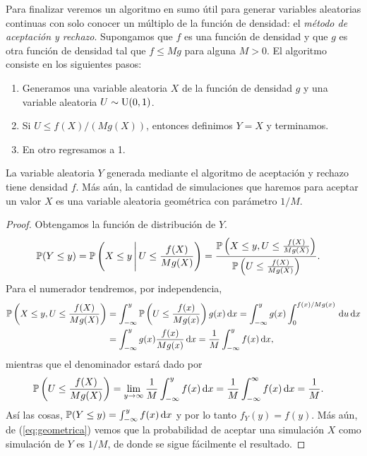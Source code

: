 Para finalizar veremos un algoritmo en sumo útil para generar variables aleatorias continuas con solo conocer un múltiplo de la función de densidad: el \emph{método de aceptación y rechazo}. Supongamos que $f$ es una función de densidad y que $g$ es otra función de densidad tal que $f \leq M g$ para alguna $M > 0$. El algoritmo consiste en los siguientes pasos:
\begin{enumerate}
    \item Generamos una variable aleatoria $X$ de la función de densidad $g$ y una variable aleatoria $U \sim \operatorname{U}(0,1)$.
    \item Si $U \leq f(X) / (M g(X))$, entonces definimos $Y = X$ y terminamos.
    \item En otro regresamos a 1.
\end{enumerate}

\begin{proposition} \label{prop:aceptacion y rechazo}
    La variable aleatoria $Y$ generada mediante el algoritmo de aceptación y rechazo tiene densidad $f$. Más aún, la cantidad de simulaciones que haremos para aceptar un valor $X$ es una variable aleatoria geométrica con parámetro $1/M$.
\end{proposition}

\begin{proof}
    Obtengamos la función de distribución de $Y$. 
    \begin{align*}
        \mathbb P(Y \leq y) & = \mathbb P \left( X \leq y \,\Bigg\vert\, U \leq \frac{f(X)}{M g(X)} \right) 
        = \frac{\mathbb P \left( X \leq y, U \leq \frac{f(X)}{Mg(X)} \right)}{\mathbb P \left(U \leq \frac{f(X)}{Mg(X)} \right)}.
    \end{align*}
    Para el numerador tendremos, por independencia,
    \begin{align*}
        \mathbb P \left( X \leq y, U \leq \frac{f(X)}{Mg(X)} \right) & = \int_{-\infty}^y \mathbb P\left(U \leq \frac{f(x)}{Mg(x)}\right) g(x) \,\mathrm d x = \int_{-\infty}^y g(x) \int_0^{f(x)/Mg(x)} \,\mathrm d u \,\mathrm d x \\
        & = \int_{-\infty}^y g(x) \frac{f(x)}{Mg(x)} \,\mathrm d x = \frac 1 M \int_{-\infty}^y f(x) \,\mathrm d x,
    \end{align*}
    mientras que el denominador estará dado por 
    \begin{align}
        \mathbb P \left(U \leq \frac{f(X)}{Mg(X)} \right) & = \lim_{y \to \infty} \frac 1 M \int_{-\infty}^y f(x) \,\mathrm d x = \frac 1 M \int_{-\infty}^\infty f(x) \,\mathrm d x = \frac 1 M. \label{eq:geometrica}
    \end{align}
    Así las cosas, $\mathbb P(Y \leq y) = \int_{-\infty}^y f(x) \,\mathrm d x$ y por lo tanto $f_Y(y) = f(y)$. Más aún, de (\ref{eq:geometrica}) vemos que la probabilidad de aceptar una simulación $X$ como simulación de $Y$ es $1/M$, de donde se sigue fácilmente el resultado.
\end{proof}

